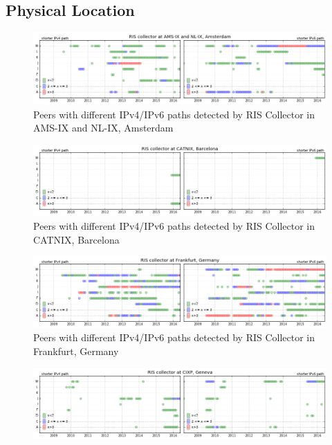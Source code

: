 \begin{appendices}
	\chapter{Physical Location}
	\label{app:physical-loc}
	\begin{figure}[!htb]
		\centering
		\includegraphics[width=6.0in]{img/coll-ams-ix.png}
		\caption{Peers with different IPv4/IPv6 paths detected by RIS Collector in AMS-IX and NL-IX, Amsterdam}
		\label{fig:coll-ams-ix}
	\end{figure}
	\begin{figure}[!htb]
		\centering
		\includegraphics[width=6.0in]{img/coll-barcelona.png}
		\caption{Peers with different IPv4/IPv6 paths detected by RIS Collector in CATNIX, Barcelona}
		\label{fig:coll-barcelona}
	\end{figure}	
	\begin{figure}[!htb]
		\centering
		\includegraphics[width=6.0in]{img/coll-frankfurt.png}
		\caption{Peers with different IPv4/IPv6 paths detected by RIS Collector in Frankfurt, Germany}
		\label{fig:coll-frankfurt}
	\end{figure}
	\begin{figure}[!htb]
		\centering
		\includegraphics[width=6.0in]{img/coll-geneva.png}

\end{figure}
\end{appendices}
